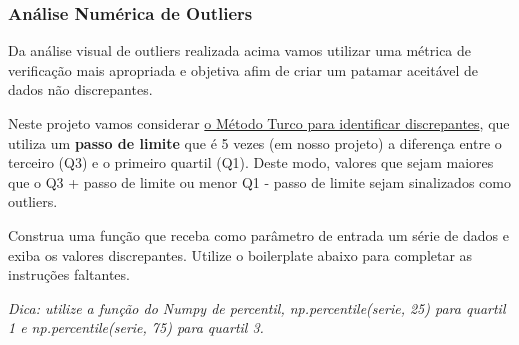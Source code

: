 \documentclass[11pt]{article}
\begin{document}
    \subsubsection{Análise Numérica de
Outliers}\label{anuxe1lise-numuxe9rica-de-outliers}

    Da análise visual de outliers realizada acima vamos utilizar uma métrica
de verificação mais apropriada e objetiva afim de criar um patamar
aceitável de dados não discrepantes.

Neste projeto vamos considerar
\href{http://datapigtechnologies.com/blog/index.php/highlighting-outliers-in-your-data-with-the-tukey-method/}{o
Método Turco para identificar discrepantes}, que utiliza um
\textbf{passo de limite} que é 5 vezes (em nosso projeto) a diferença
entre o terceiro (Q3) e o primeiro quartil (Q1). Deste modo, valores que
sejam maiores que o Q3 + passo de limite ou menor Q1 - passo de limite
sejam sinalizados como outliers.

Construa uma função que receba como parâmetro de entrada um série de
dados e exiba os valores discrepantes. Utilize o boilerplate abaixo para
completar as instruções faltantes.

\emph{Dica: utilize a função do Numpy de percentil, np.percentile(serie,
25) para quartil 1 e np.percentile(serie, 75) para quartil 3.}
\end{document}
